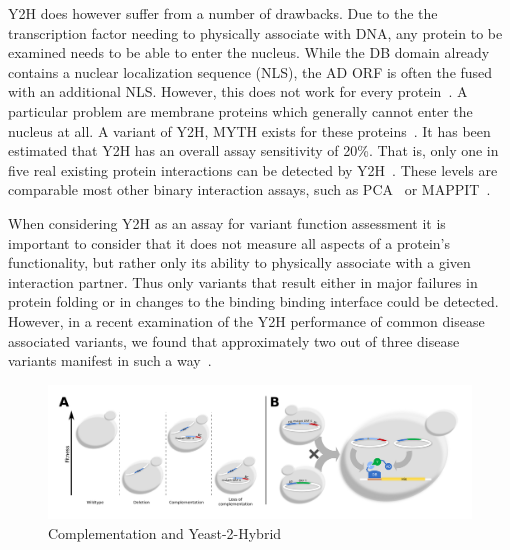 Y2H does however suffer from a number of drawbacks. Due to the the transcription factor needing to physically associate with DNA, any protein to be examined needs to be able to enter the nucleus. While the DB domain already contains a nuclear localization sequence (NLS), the AD ORF is often the fused with an additional NLS. However, this does not work for every protein~\cite{van_criekinge_yeast_1999}. A particular problem are membrane proteins which generally cannot enter the nucleus at all. A variant of Y2H, MYTH exists for these proteins~\cite{snider_split-ubiquitin_2010}. It has been estimated that Y2H has an overall assay sensitivity of 20\%. That is, only one in five real existing protein interactions can be detected by Y2H~\cite{venkatesan_empirical_2009}. These levels are comparable most other binary interaction assays, such as PCA~\cite{tarassov_vivo_2008} or MAPPIT~\cite{eyckerman_design_2001}.


When considering Y2H as an assay for variant function assessment it is important to consider that it does not measure all aspects of a protein's functionality, but rather only its ability to physically associate with a given interaction partner. Thus only variants that result either in major failures in protein folding or in changes to the binding binding interface could be detected. However, in a recent examination of the Y2H performance of common disease associated variants, we found that approximately two out of three disease variants manifest in such a way~\cite{sahni_widespread_2015}. 


\begin{figure}[h!]
	\centering
	\includegraphics[width=\textwidth]{img/compl_y2h.pdf}
	\caption{Complementation and Yeast-2-Hybrid}
	\label{fig:compl_y2h}
\end{figure}

